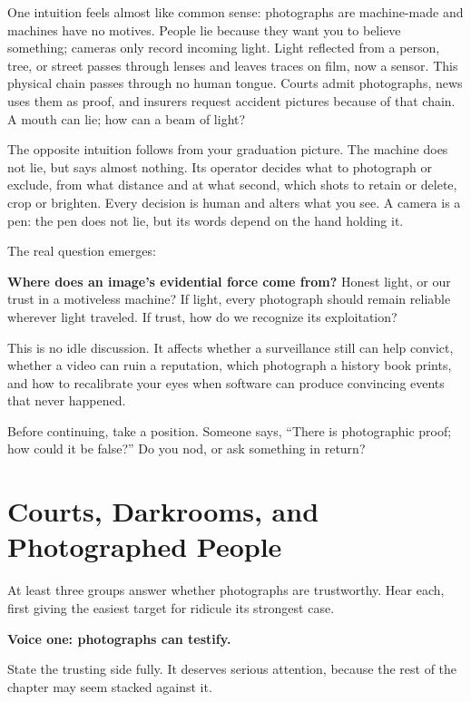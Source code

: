 One intuition feels almost like common sense: photographs are machine-made and machines have no motives. People lie because they want you to believe something; cameras only record incoming light. Light reflected from a person, tree, or street passes through lenses and leaves traces on film, now a sensor. This physical chain passes through no human tongue. Courts admit photographs, news uses them as proof, and insurers request accident pictures because of that chain. A mouth can lie; how can a beam of light?

The opposite intuition follows from your graduation picture. The machine does not lie, but says almost nothing. Its operator decides what to photograph or exclude, from what distance and at what second, which shots to retain or delete, crop or brighten. Every decision is human and alters what you see. A camera is a pen: the pen does not lie, but its words depend on the hand holding it.

The real question emerges:

\textbf{Where does an image's evidential force come from?} Honest light, or our trust in a motiveless machine? If light, every photograph should remain reliable wherever light traveled. If trust, how do we recognize its exploitation?

This is no idle discussion. It affects whether a surveillance still can help convict, whether a video can ruin a reputation, which photograph a history book prints, and how to recalibrate your eyes when software can produce convincing events that never happened.

Before continuing, take a position. Someone says, ``There is photographic proof; how could it be false?'' Do you nod, or ask something in return?

\section[Courts and Photographed People]{Courts, Darkrooms, and Photographed People}
At least three groups answer whether photographs are trustworthy. Hear each, first giving the easiest target for ridicule its strongest case.

\textbf{Voice one: photographs can testify.}

State the trusting side fully. It deserves serious attention, because the rest of the chapter may seem stacked against it.

